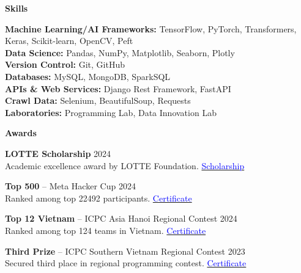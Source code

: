 \documentclass[10pt]{article}
\begin{document}
\begin{center}
    \textbf{Skills}
\end{center}

\textbf{Machine Learning/AI Frameworks:} TensorFlow, PyTorch, Transformers, Keras, Scikit-learn, OpenCV, Peft \\
\textbf{Data Science:} Pandas, NumPy, Matplotlib, Seaborn, Plotly \\
\textbf{Version Control:} Git, GitHub \\
\textbf{Databases:} MySQL, MongoDB, SparkSQL \\
\textbf{APIs \& Web Services:} Django Rest Framework, FastAPI \\
\textbf{Crawl Data:} Selenium, BeautifulSoup, Requests \\
\textbf{Laboratories:} Programming Lab, Data Innovation Lab

\begin{center}
    \vspace{0.05cm}
    \hrulefill
    \vspace{0.05cm}
\end{center}

\begin{center}
    \textbf{Awards}
\end{center}

\textbf{LOTTE Scholarship} \hfill 2024 \\
Academic excellence award by LOTTE Foundation. \hfill \href{https://drive.google.com/file/d/1-VoS_M4o_Dtu5mwoOiM1BGahttdvneo4/view?usp=sharing}{\textcolor{blue}{Scholarship}}

\textbf{Top 500} -- Meta Hacker Cup \hfill 2024 \\
Ranked among top 22492 participants. \hfill \href{https://www.facebook.com/codingcompetitions/hacker-cup/2024/certificate/484986933064775?source=facebook}{\textcolor{blue}{Certificate}}

\textbf{Top 12 Vietnam} -- ICPC Asia Hanoi Regional Contest \hfill 2024 \\
Ranked among top 124 teams in Vietnam. \hfill \href{https://github.com/taitruong256/Competitive-programming/blob/main/DH-Cong-nghiep-Thanh-pho-Ho-Chi-Minh-certificates-Top12-Viet-Nam.pdf}{\textcolor{blue}{Certificate}}

\textbf{Third Prize} -- ICPC Southern Vietnam Regional Contest \hfill 2023 \\
Secured third place in regional programming contest. \hfill \href{https://github.com/taitruong256/Competitive-programming/blob/main/2024-ICPC-Vietnam-Southern-Provincial-PC-MEDAL.pdf}{\textcolor{blue}{Certificate}}
\end{document}
